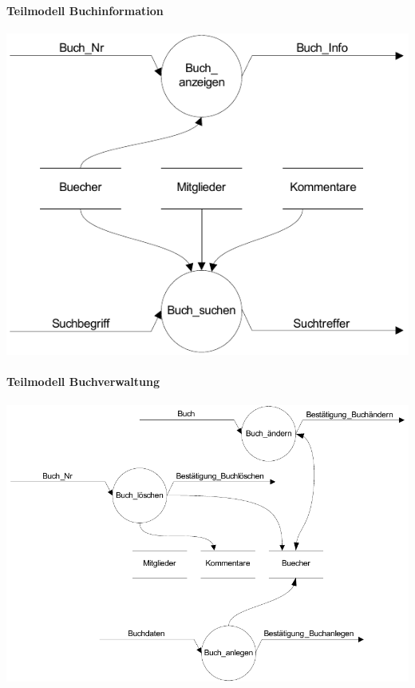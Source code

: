 \paragraph{Teilmodell Buchinformation}
\includegraphics[scale=1.0]{teilmodell_buchinformation}

\paragraph{Teilmodell Buchverwaltung}
\includegraphics[scale=0.93]{teilmodell_buchverwaltung}

